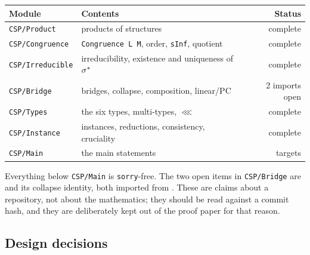 \begin{center}
\begin{tabular}{@{}llr@{}}
\hline
Module & Contents & Status \\
\hline
\texttt{CSP/Product} & products of structures & complete \\
\texttt{CSP/Congruence} & \texttt{Congruence L M}, order, \texttt{sInf}, quotient & complete \\
\texttt{CSP/Irreducible} & irreducibility, existence and uniqueness of $\sigma^{*}$ & complete \\
\texttt{CSP/Bridge} & bridges, collapse, composition, linear/PC & 2 imports open \\
\texttt{CSP/Types} & the six types, multi-types, $\lll$ & complete \\
\texttt{CSP/Instance} & instances, reductions, consistency, cruciality & complete \\
\texttt{CSP/Main} & the main statements & targets \\
\hline
\end{tabular}
\end{center}

Everything below \texttt{CSP/Main} is \texttt{sorry}-free. The two open items in
\texttt{CSP/Bridge} are  and its collapse identity,
both imported from \cite{ZhukJACM}. These are claims about a repository, not
about the mathematics; they should be read against a commit hash, and they are
deliberately kept out of the proof paper for that reason.

\subsection{Design decisions}\label{sec:design}


